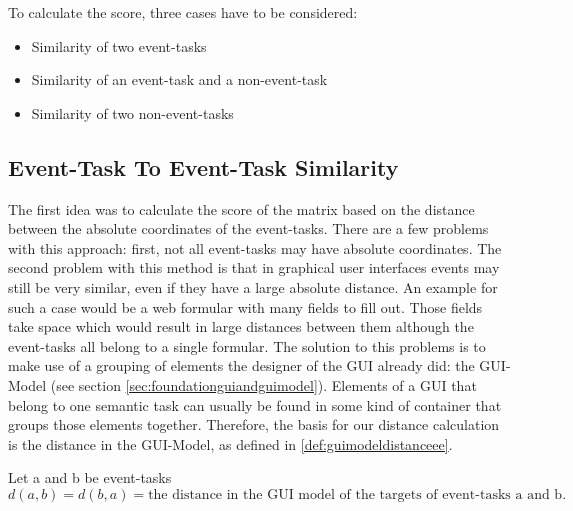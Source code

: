 To calculate the score, three cases have to be considered:
\begin{itemize}
	\item Similarity of two event-tasks
	\item Similarity of an event-task and a non-event-task
	\item Similarity of two non-event-tasks
\end{itemize}

\subsection{Event-Task To Event-Task Similarity}
The first idea was to calculate the score of the matrix based on the distance between the absolute coordinates of the event-tasks.
There are a few problems with this approach: first, not all event-tasks may have absolute coordinates.
The second problem with this method is that in graphical user interfaces events may still be very similar, even if they have a large absolute distance.
An example for such a case would be a web formular with many fields to fill out.
Those fields take space which would result in large distances between them although the event-tasks all belong to a single formular.
The solution to this problems is to make use of a grouping of elements the designer of the GUI already did: the GUI-Model (see section \ref{sec:foundationguiandguimodel}).
Elements of a GUI that belong to one semantic task can usually be found in some kind of container that groups those elements together.
Therefore, the basis for our distance calculation is the distance in the GUI-Model, as defined in \ref{def:guimodeldistanceee}.

\begin{definition}
	\item Let a and b be event-tasks
\begin{equation*}d(a,b) = d(b,a) = \text{the distance in the GUI model of the targets of event-tasks a and b.}
\end{equation*}
\label{def:guimodeldistanceee}
\end{definition}

